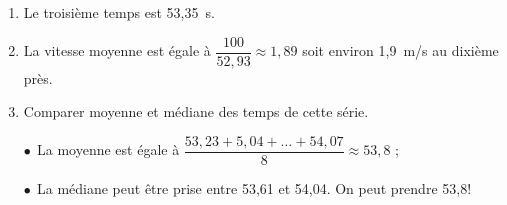 \documentclass[10pt]{article}
\begin{document}
%

\begin{enumerate}
\item %
Le troisième temps est 53,35~s.
\item %
La vitesse moyenne est égale à $\dfrac{100}{52,93} \approx 1,89$ soit environ 1,9~m/s au dixième près.
\item Comparer moyenne et médiane des temps de cette série.

$\bullet~~$La moyenne est égale à $\dfrac{53,23 + 5,04 + \ldots + 54,07}{8}  \approx 53,8$ ;

$\bullet~~$La médiane peut être prise entre 53,61 et 54,04. On peut prendre 53,8!

\medskip




\end{enumerate}
\end{document}
